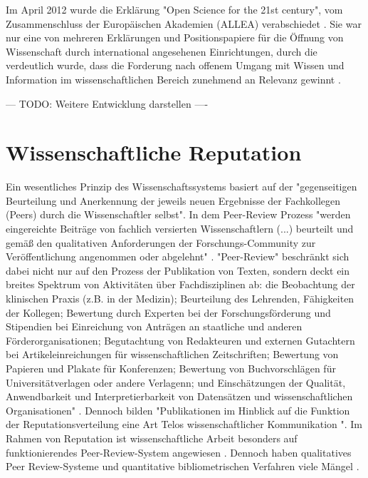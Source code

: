 Im April 2012 wurde die Erklärung "Open Science for the 21st century", vom Zusammenschluss der Europäischen Akademien (ALLEA) verabschiedet \cite{ALLEA_2012}. Sie war nur eine von mehreren Erklärungen und Positionspapiere für die Öffnung von Wissenschaft durch international angesehenen Einrichtungen, durch die verdeutlich wurde, dass die Forderung nach offenem Umgang mit Wissen und Information im wissenschaftlichen Bereich zunehmend an Relevanz gewinnt \cite{schulze_2013_open}.

--- TODO: Weitere Entwicklung darstellen ----


\section{Wissenschaftliche Reputation}

Ein wesentliches Prinzip des Wissenschaftssystems basiert auf der "gegenseitigen Beurteilung und Anerkennung der jeweils neuen Ergebnisse der Fachkollegen (Peers) durch die Wissenschaftler selbst"\cite{Hanekop_2014}. In dem Peer-Review Prozess "werden eingereichte Beiträge von fachlich versierten Wissenschaftlern (...) beurteilt und gemäß den qualitativen Anforderungen der Forschungs-Community zur Veröffentlichung angenommen oder abgelehnt" \cite{Hess_2006}. "Peer-Review" beschränkt sich dabei nicht nur auf den Prozess der Publikation von Texten, sondern deckt ein breites Spektrum von Aktivitäten über Fachdisziplinen ab: die Beobachtung der klinischen Praxis (z.B. in der Medizin); Beurteilung des Lehrenden, Fähigkeiten der Kollegen; Bewertung durch Experten bei der Forschungsförderung und Stipendien bei Einreichung von Anträgen an staatliche und anderen Förderorganisationen; Begutachtung von Redakteuren und externen Gutachtern bei Artikeleinreichungen für wissenschaftlichen Zeitschriften; Bewertung von Papieren und Plakate für Konferenzen; Bewertung von Buchvorschlägen für Universitätverlagen oder andere Verlagenn; und Einschätzungen der Qualität, Anwendbarkeit und Interpretierbarkeit von Datensätzen und wissenschaftlichen Organisationen" \cite{Lee_2012}. Dennoch bilden "Publikationen im Hinblick auf die Funktion der Reputationsverteilung eine Art Telos wissenschaftlicher Kommunikation "\cite{hirschauer2004peer}. Im Rahmen von Reputation ist wissenschaftliche Arbeit besonders auf funktionierendes Peer-Review-System angewiesen \cite{suchen}. Dennoch haben qualitatives Peer Review-Systeme und quantitative bibliometrischen Verfahren viele Mängel\cite{osterloh2008anreize} \cite{Lee_2012}.

